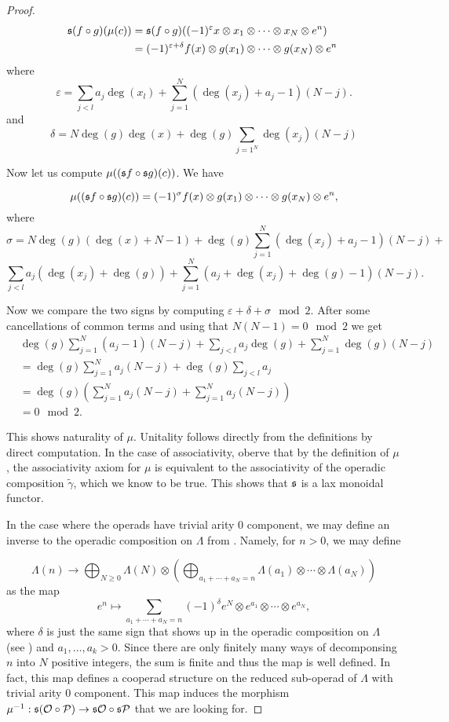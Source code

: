 \documentclass[Thesis.tex]{subfiles}
\begin{document}
\begin{proof}
\begin{align*}
\mathfrak{s}(f\circ g)(\mu(c))&=\mathfrak{s}(f\circ g)((-1)^{\varepsilon} x\otimes x_1\otimes\cdots\otimes x_N \otimes e^n)\\
&=(-1)^{\varepsilon+\delta}f(x)\otimes g(x_1)\otimes\cdots\otimes g(x_N) \otimes e^n\
\end{align*}
where
\[\varepsilon=\sum_{j<l}a_j\deg(x_l)+\sum_{j=1}^N (\deg(x_j)+a_j-1)(N-j).\]
and
\[\delta = N\deg(g)\deg(x)+\deg(g)\sum_{j=1^N}\deg(x_j)(N-j)\]


Now let us compute $\mu((\mathfrak{s} f\circ \mathfrak{s}  g)(c))$. We have

\[\mu((\mathfrak{s} f\circ \mathfrak{s}  g)(c))=(-1)^\sigma f(x)\otimes g(x_1)\otimes\cdots\otimes g(x_N) \otimes e^n,\]
where 
\[\sigma=N\deg(g)(\deg(x)+N-1)+\deg(g)\sum_{j=1}^N(\deg(x_j)+a_j-1)(N-j)+\]\[\sum_{j<l}a_j(\deg(x_j)+\deg(g))+\sum_{j=1}^N(a_j+\deg(x_j)+\deg(g)-1)(N-j).\]
 
 Now we compare the two signs by computing $\varepsilon+\delta+\sigma\mod 2$. After some cancellations of common terms and using that $N(N-1)=0\mod 2$ we get
 \begin{align*}
 &\deg(g)\sum_{j=1}^N(a_j-1)(N-j)+\sum_{j<l}a_j\deg(g)+\sum_{j=1}^N\deg(g)(N-j)\\
 &=\deg(g)\sum_{j=1}^Na_j(N-j)+\deg(g)\sum_{j<l}a_j\\
 &=\deg(g)\left(\sum_{j=1}^N a_j(N-j)+\sum_{j=1}^N a_j(N-j)\right)\\
 &=0\mod 2.
 \end{align*}

 This shows naturality of $\mu$. %
 Unitality follows directly from the definitions by direct computation. In the case of associativity, oberve that by the definition of $\mu$, the associativity axiom for $\mu$ is equivalent to the associativity of the operadic composition $\tilde{\gamma}$, which we know to be true. This shows that $\mathfrak{s}$ is a lax monoidal functor.
 
In the case where the operads have trivial arity 0 component, we may define an inverse to the operadic composition on $\Lambda$ from . Namely, for $n>0$, we may define

\[\Lambda(n)\to \bigoplus_{N\geq 0} \Lambda(N)\otimes\left(\bigoplus_{a_1+\cdots+a_N=n}\Lambda(a_1)\otimes\cdots\otimes\Lambda(a_N)\right)\]
as the map
\[e^n\mapsto\sum_{a_1+\cdots+a_N=n}(-1)^{\delta}e^N\otimes  e^{a_1}\otimes\cdots\otimes e^{a_N},\]
where $\delta$ is just the same sign that shows up in the operadic composition on $\Lambda$ (see ) and $a_1,\dots,a_k>0$. Since there are only finitely many ways of decomponsing $n$ into $N$ positive integers, the sum is finite and thus the map is well defined. In fact, this map defines a cooperad structure on the reduced sub-operad of $\Lambda$ with trivial arity 0 component. This map induces the morphism $\mu^{-1}:\mathfrak{s}({\mathcal O}\circ\mathcal{P})\to \mathfrak{s}{\mathcal O}\circ\mathfrak{s}\mathcal{P}$ that we are looking for.


\end{proof}
\end{document}
